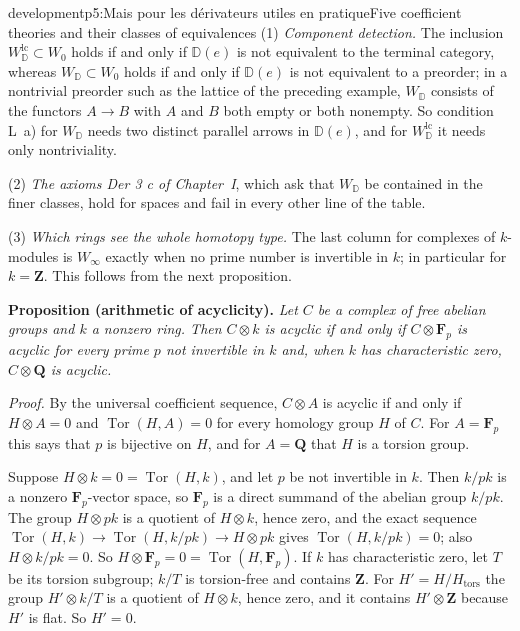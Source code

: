 \begin{dcomment}{development}{p5:Mais pour les dérivateurs utiles en pratique}{Five coefficient theories and their classes of equivalences}
(1) \emph{Component detection.} The inclusion $W^{\mathrm{lc}}_{\mathbb D}\subset W_0$ holds if and only if $\mathbb D(e)$ is not equivalent to the terminal category, whereas $W_{\mathbb D}\subset W_0$ holds if and only if $\mathbb D(e)$ is not equivalent to a preorder; in a nontrivial preorder such as the lattice of the preceding example, $W_{\mathbb D}$ consists of the functors $A\to B$ with $A$ and $B$ both empty or both nonempty. So condition L~a) for $W_{\mathbb D}$ needs two distinct parallel arrows in $\mathbb D(e)$, and for $W^{\mathrm{lc}}_{\mathbb D}$ it needs only nontriviality.

(2) \emph{The axioms Der 3 c of Chapter~I}, which ask that $W_{\mathbb D}$ be contained in the finer classes, hold for spaces and fail in every other line of the table.

(3) \emph{Which rings see the whole homotopy type.} The last column for complexes of $k$-modules is $W_\infty$ exactly when no prime number is invertible in $k$; in particular for $k=\mathbf Z$. This follows from the next proposition.

\textbf{Proposition (arithmetic of acyclicity).}\ours
\textit{Let $C$ be a complex of free abelian groups and $k$ a nonzero ring. Then $C\otimes k$ is acyclic if and only if $C\otimes\mathbf F_p$ is acyclic for every prime $p$ not invertible in $k$ and, when $k$ has characteristic zero, $C\otimes\mathbf Q$ is acyclic.}

\textit{Proof.}
By the universal coefficient sequence, $C\otimes A$ is acyclic if and only if $H\otimes A=0$ and $\operatorname{Tor}(H,A)=0$ for every homology group $H$ of $C$. For $A=\mathbf F_p$ this says that $p$ is bijective on $H$, and for $A=\mathbf Q$ that $H$ is a torsion group.

Suppose $H\otimes k=0=\operatorname{Tor}(H,k)$, and let $p$ be not invertible in $k$. Then $k/pk$ is a nonzero $\mathbf F_p$-vector space, so $\mathbf F_p$ is a direct summand of the abelian group $k/pk$. The group $H\otimes pk$ is a quotient of $H\otimes k$, hence zero, and the exact sequence $\operatorname{Tor}(H,k)\to\operatorname{Tor}(H,k/pk)\to H\otimes pk$ gives $\operatorname{Tor}(H,k/pk)=0$; also $H\otimes k/pk=0$. So $H\otimes\mathbf F_p=0=\operatorname{Tor}(H,\mathbf F_p)$. If $k$ has characteristic zero, let $T$ be its torsion subgroup; $k/T$ is torsion-free and contains $\mathbf Z$. For $H'=H/H_{\mathrm{tors}}$ the group $H'\otimes k/T$ is a quotient of $H\otimes k$, hence zero, and it contains $H'\otimes\mathbf Z$ because $H'$ is flat. So $H'=0$.


\end{dcomment}
